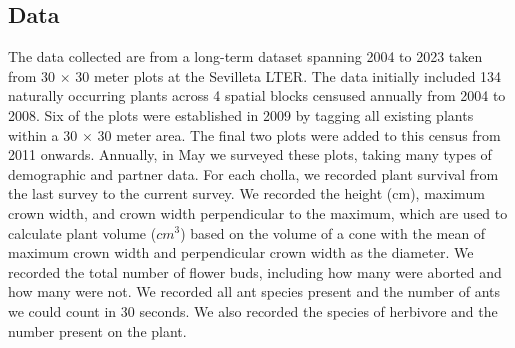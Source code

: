 \documentclass[12pt,a4paper]{article}
\begin{document}
	
	\subsection*{Data}
The data collected are from a long-term dataset spanning 2004 to 2023 taken from 30 $\times$ 30 meter plots at the Sevilleta LTER. 
The data initially included 134 naturally occurring plants across 4 spatial blocks censused annually from 2004 to 2008.
Six of the plots were established in 2009 by tagging all existing plants within a 30 $\times$ 30 meter area. 
The final two plots were added to this census from 2011 onwards. 
Annually, in May we surveyed these plots, taking many types of demographic and partner data. 
For each cholla, we recorded plant survival from the last survey to the current survey. 
We recorded the height (cm), maximum crown width, and crown width perpendicular to the maximum, which are used to calculate plant volume ($cm^3$) based on the volume of a cone with the mean of maximum crown width and perpendicular crown width as the diameter. 
We recorded the total number of flower buds, including how many were aborted and how many were not. We recorded all ant species present and the number of ants we could count in 30 seconds. 
We also recorded the species of herbivore and the number present on the plant.
		
\end{document}
